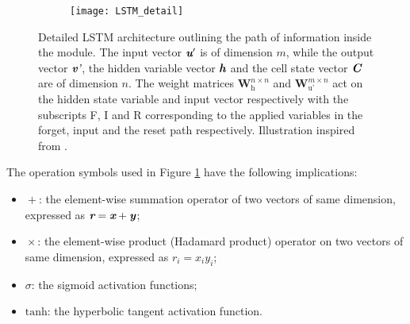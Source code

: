 \begin{figure}
	\centering
	\begin{subfigure}{0.98\textwidth}
		\texttt{[image: LSTM\_detail]}
	\end{subfigure}
	\caption{Detailed LSTM architecture outlining the path of information inside the module. The input vector $ \textit{\textbf{u}}' $ is of dimension $ m $, while the output vector $ \textit{\textbf{v}'} $, the hidden variable vector $ \textit{\textbf{h}} $ and the cell state vector $ \textit{\textbf{C}} $ are of dimension $ n $. The weight matrices $ \textbf{W}^{n\times n}_\text{h} $ and $ \textbf{W}^{m\times n}_\text{u'} $ act on the hidden state variable and input vector respectively with the subscripts F, I and R corresponding to the applied variables in the forget, input and the reset path respectively. Illustration inspired from \cite{UnderstandingLSTMNetworks}.}\label{app-lstm-detail}
\end{figure}

The operation symbols used in Figure \ref{app-lstm-detail} have the following implications:
\begin{itemize}
	\item $ \boxed{+} $: the element-wise summation operator of two vectors of same dimension, expressed as $ \textit{\textbf{r}}=\textit{\textbf{x}}+\textbf{\textit{y}} $;
	\item $ \boxed{\times} $: the element-wise product (Hadamard product) operator on two vectors of same dimension, expressed as $ r_i=x_iy_i $;
	\item $ \boxed{\sigma} $: the sigmoid activation functions;
	\item $ \boxed{\text{tanh}} $: the hyperbolic tangent activation function.
\end{itemize}

